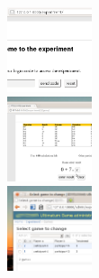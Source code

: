 \documentclass[10pt, a5paper]{article}
\begin{document}
\vspace{1cm}

\newpage 
\begin{minipage}[t]{.3\linewidth}
    \includegraphics[width=2.5cm]{img/ultimatum_welcome.png}\\[.4cm]
    \includegraphics[width=2.5cm]{img/ultimatum_game.png}\\[.4cm]
    \includegraphics[width=2.5cm]{img/ultimatum_admin.png}
\end{minipage}
\hfill
\end{document}
